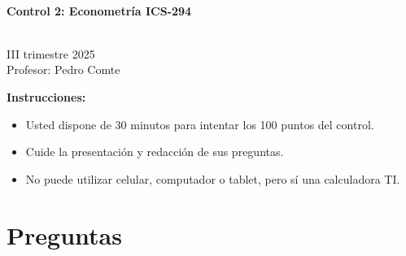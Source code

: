 \documentclass[10pt,a4paper]{article}
\begin{document}
\vspace{5cm}



\begin{center}
\begin{large}
\textbf{\\Control 2: Econometría ICS-294}
\end{large}\\
\vspace{0.2cm}
III trimestre 2025\\
Profesor: Pedro Comte\\
\end{center}

\textbf{Instrucciones:} 

\begin{itemize}

    \item Usted dispone de 30 minutos  para intentar los 100 puntos del control.
    \item Cuide la presentación y redacción de sus preguntas.
    \item No puede utilizar celular, computador o tablet, pero sí una calculadora TI.
     
\end{itemize}

\section{Preguntas}
\end{document}
